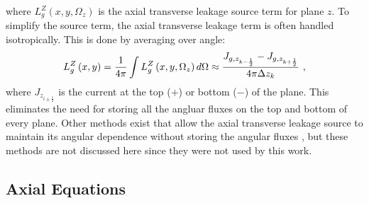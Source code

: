 where $L_{g}^Z\left(x,y,\Omega_z\right)$ is the axial transverse leakage source term for plane $z$.  To simplify the source term, the axial transverse leakage term is often handled isotropically.  This is done by averaging over angle:
\begin{equation}\label{e:axialTL}
L_{g}^Z\left(x,y\right) = \frac{1}{4\pi}\intop L_{g}^Z\left(x,y,\Omega_z\right)d\Omega \approx \frac{J_{g,z_{k-\frac{1}{2}}} - J_{g,z_{k+\frac{1}{2}}}}{4\pi\Delta z_k}\ ,
\end{equation}
where $J_{z_{i\pm \frac{1}{2}}}$ is the current at the top ($+$) or bottom ($-$) of the plane.  This eliminates the need for storing all the angluar fluxes on the top and bottom of every plane.  Other methods exist that allow the axial transverse leakage source to maintain its angular dependence without storing the angular fluxes \cite{KelleyBlakeThesis}, but these methods are not discussed here since they were not used by this work.

\subsection{Axial Equations}\label{ss:2d1daxialEq}

